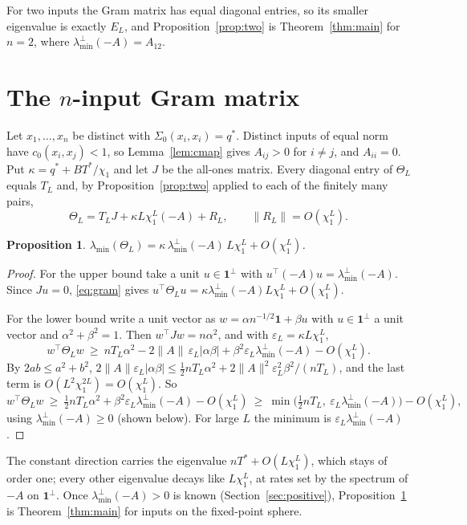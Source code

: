 \documentclass[11pt]{amsart}
\newtheorem{proposition}[theorem]{Proposition}
\theoremstyle{remark}\newtheorem{remark}[theorem]{Remark}
\begin{document}
For two inputs the Gram matrix has equal diagonal entries, so its smaller eigenvalue is exactly $E_L$, and
Proposition~\ref{prop:two} is Theorem~\ref{thm:main} for $n=2$, where $\lambda_{\min}^\perp(-A)=A_{12}$.

\section{The $n$-input Gram matrix}\label{sec:ninput}
Let $x_1,\dots,x_n$ be distinct with $\Sigma_0(x_i,x_i)=q^*$. Distinct inputs of equal norm have $c_0(x_i,x_j)<1$, so
Lemma~\ref{lem:cmap} gives $A_{ij}>0$ for $i\ne j$, and $A_{ii}=0$. Put $\kappa=q^*+BT^*/\chi_1$ and let $J$ be the
all-ones matrix. Every diagonal entry of $\Theta_L$ equals $T_L$ and, by Proposition~\ref{prop:two} applied to each of the
finitely many pairs,
\begin{equation}\label{eq:gram}
\Theta_L=T_LJ+\kappa L\chi_1^L(-A)+R_L,\qquad \|R_L\|=O(\chi_1^L).
\end{equation}

\begin{proposition}\label{prop:ninput}
$\lambda_{\min}(\Theta_L)=\kappa\,\lambda_{\min}^\perp(-A)\,L\chi_1^L+O(\chi_1^L)$.
\end{proposition}

\begin{proof}
For the upper bound take a unit $u\in\mathbf 1^\perp$ with $u^\top(-A)u=\lambda_{\min}^\perp(-A)$. Since $Ju=0$,
\eqref{eq:gram} gives $u^\top\Theta_Lu=\kappa\lambda_{\min}^\perp(-A)L\chi_1^L+O(\chi_1^L)$.

For the lower bound write a unit vector as $w=\alpha n^{-1/2}\mathbf 1+\beta u$ with $u\in\mathbf 1^\perp$ a unit vector and
$\alpha^2+\beta^2=1$. Then $w^\top Jw=n\alpha^2$, and with $\varepsilon_L=\kappa L\chi_1^L$,
\[
w^\top\Theta_Lw\ \ge\ nT_L\alpha^2-2\|A\|\,\varepsilon_L|\alpha\beta|+\beta^2\varepsilon_L\lambda_{\min}^\perp(-A)-O(\chi_1^L).
\]
By $2ab\le a^2+b^2$, $2\|A\|\varepsilon_L|\alpha\beta|\le\tfrac12nT_L\alpha^2+2\|A\|^2\varepsilon_L^2\beta^2/(nT_L)$, and
the last term is $O(L^2\chi_1^{2L})=O(\chi_1^L)$. So
\[
w^\top\Theta_Lw\ \ge\ \tfrac12nT_L\alpha^2+\beta^2\varepsilon_L\lambda_{\min}^\perp(-A)-O(\chi_1^L)
\ \ge\ \min\big(\tfrac12nT_L,\ \varepsilon_L\lambda_{\min}^\perp(-A)\big)-O(\chi_1^L),
\]
using $\lambda_{\min}^\perp(-A)\ge0$ (shown below). For large $L$ the minimum is $\varepsilon_L\lambda_{\min}^\perp(-A)$.
\end{proof}

The constant direction carries the eigenvalue $nT^*+O(L\chi_1^L)$, which stays of order one; every other eigenvalue
decays like $L\chi_1^L$, at rates set by the spectrum of $-A$ on $\mathbf 1^\perp$. Once
$\lambda_{\min}^\perp(-A)>0$ is known (Section~\ref{sec:positive}), Proposition~\ref{prop:ninput} is
Theorem~\ref{thm:main} for inputs on the fixed-point sphere.
\end{document}
